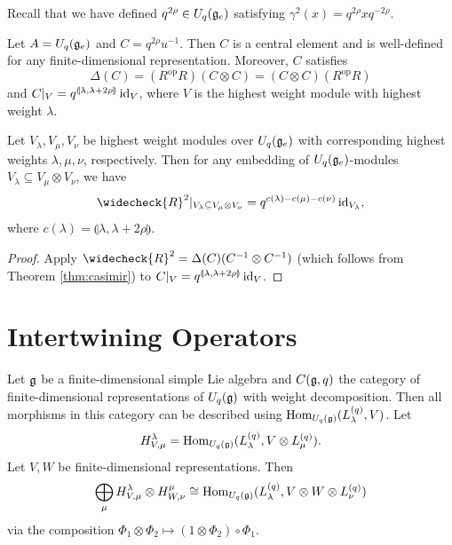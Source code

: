 \begin{remark}
  Recall that we have
  defined $q^{2\rho} \in U_q(\mathfrak{g}_e)$
  satisfying
  $\gamma^2(x) = q^{2\rho} x q^{-2\rho}$.
\end{remark}

\begin{theorem}\label{thm:casimir}
  Let $A = U_q(\mathfrak{g}_e)$ and
  $C = q^{2\rho} u^{-1}$. Then
  $C$ is a central element
  and is well-defined for any finite-dimensional
  representation. Moreover, $C$ satisfies
  \[
    \Delta(C)
    = (R^{\mathrm{op}} R) (C \otimes C)
    = (C \otimes C) (R^{\mathrm{op}} R)
  \]
  and
  $C|_V = q^{\llparenthesis \lambda, \lambda + 2\rho \rrparenthesis} \operatorname{id}_V$,
  where $V$ is the highest weight module
  with highest weight $\lambda$.
\end{theorem}

\begin{corollary}
  Let $V_\lambda, V_\mu, V_\nu$ be
  highest weight modules over
  $U_q(\mathfrak{g}_e)$ with
  corresponding highest weights $\lambda, \mu, \nu$,
  respectively. Then for any
  embedding of $U_q(\mathfrak{g}_e)$-modules
  $V_\lambda \subseteq V_\mu \otimes V_\nu$,
  we have
  \[
    \widecheck{R}^2|_{V_\lambda \subseteq V_\mu \otimes V_\nu}
    = q^{c(\lambda) - c(\mu) - c(\nu)} \id_{V_\lambda},
  \]
  where $c(\lambda) = \llparenthesis \lambda, \lambda + 2\rho \rrparenthesis$.
\end{corollary}

\begin{proof}
  Apply $\widecheck{R}^2 = \Delta(C)(C^{-1} \otimes C^{-1})$
  (which follows from Theorem \ref{thm:casimir})
  to $C|_V = q^{\llparenthesis \lambda, \lambda + 2\rho \rrparenthesis} \operatorname{id}_V$.
\end{proof}

\section{Intertwining Operators}

\begin{remark}
  Let $\mathfrak{g}$ be a finite-dimensional simple Lie
  algebra
  and $C(\mathfrak{g}, q)$ the category of
  finite-dimensional representations of
  $U_q(\mathfrak{g})$ with weight decomposition. Then
  all
  morphisms in this category
  can be described using
  $\operatorname{Hom}_{U_q(\mathfrak{g})}(L^{(q)}_\lambda, V)$.
  Let
  \[
    H_{V, \mu}^\lambda
    = \operatorname{Hom}_{U_q(\mathfrak{g})}(L^{(q)}_\lambda, V \otimes L^{(q)}_\mu).
  \]
  Let $V, W$ be finite-dimensional
  representations. Then
  \[
    \bigoplus_{\mu}
    H_{V, \mu}^\lambda \otimes H_{W, \nu}^\mu
    \cong \operatorname{Hom}_{U_q(\mathfrak{g})}(L^{(q)}_\lambda, V \otimes W \otimes L^{(q)}_\nu)
  \]
  via the composition
  $\Phi_1 \otimes \Phi_2 \mapsto (1 \otimes \Phi_2) \circ \Phi_1$.
\end{remark}

